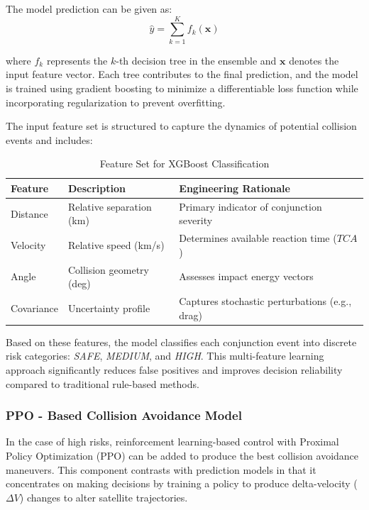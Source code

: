 \documentclass{ieeeaccess}
\begin{document}
The model prediction can be given as:
\begin{equation}
\hat{y} = \sum_{k=1}^{K} f_k(\mathbf{x})
\end{equation}

where $f_k$ represents the $k$-th decision tree in the ensemble and $\mathbf{x}$ denotes the input feature vector. Each tree contributes to the final prediction, and the model is trained using gradient boosting to minimize a differentiable loss function while incorporating regularization to prevent overfitting.

The input feature set is structured to capture the dynamics of potential collision events and includes:

\begin{table}[H]
\caption{Feature Set for XGBoost Classification}
\label{tab:xgboost_features}
\centering
\renewcommand{\arraystretch}{1.2}
\setlength{\tabcolsep}{3pt}
\begin{tabular}{|p{1.5cm}|p{2.5cm}|p{3.2cm}|}
\hline
\textbf{Feature} & \textbf{Description} & \textbf{Engineering Rationale} \\
\hline
Distance & Relative separation (km) & Primary indicator of conjunction severity \\
\hline
Velocity & Relative speed (km/s) & Determines available reaction time ($TCA$) \\
\hline
Angle & Collision geometry (deg) & Assesses impact energy vectors \\
\hline
Covariance & Uncertainty profile & Captures stochastic perturbations (e.g., drag) \\
\hline
\end{tabular}
\end{table}

Based on these features, the model classifies each conjunction event into discrete risk categories: \textit{SAFE}, \textit{MEDIUM}, and \textit{HIGH}. This multi-feature learning approach significantly reduces false positives and improves decision reliability compared to traditional rule-based methods.

\subsubsection{PPO - Based Collision Avoidance Model}
In the case of high risks, reinforcement learning-based control with Proximal Policy Optimization (PPO) can be added to produce the best collision avoidance maneuvers. This component contrasts with prediction models in that it concentrates on making decisions by training a policy to produce delta-velocity ($\Delta V$) changes to alter satellite trajectories.
\end{document}
